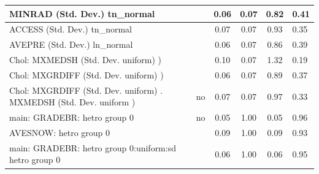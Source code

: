 \begin{table}
\begin{center}
\begin{tabular}{|l|l|c|c|c|l|}
			\hline
			MINRAD (Std. Dev.) tn_normal &  & 0.06 & 0.07 & 0.82 & 0.41 \\
			\hline
			ACCESS (Std. Dev.) tn_normal &  & 0.07 & 0.07 & 0.93 & 0.35 \\
			\hline
			AVEPRE (Std. Dev.) ln_normal &  & 0.06 & 0.07 & 0.86 & 0.39 \\
			\hline
			 Chol: MXMEDSH (Std. Dev. uniform) ) &  & 0.10 & 0.07 & 1.32 & 0.19 \\
			\hline
			 Chol: MXGRDIFF (Std. Dev. uniform) ) &  & 0.06 & 0.07 & 0.89 & 0.37 \\
			\hline
			 Chol: MXGRDIFF (Std. Dev. uniform) . MXMEDSH (Std. Dev.   uniform ) & no & 0.07 & 0.07 & 0.97 & 0.33 \\
			\hline
			main: GRADEBR: hetro group 0 & no & 0.05 & 1.00 & 0.05 & 0.96 \\
			\hline
			AVESNOW: hetro group 0 &  & 0.09 & 1.00 & 0.09 & 0.93 \\
			\hline
			main: GRADEBR: hetro group 0:uniform:sd  hetro group 0 &  & 0.06 & 1.00 & 0.06 & 0.95 \\
			\hline
		\end{tabular}
	\end{center}
\end{table}